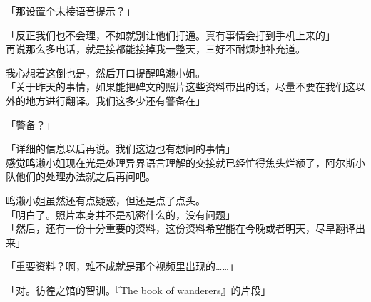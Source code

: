 「那设置个未接语音提示？」

「反正我们也不会理，不如就别让他们打通。真有事情会打到手机上来的」\\

再说那么多电话，就是接都能接掉我一整天，三好不耐烦地补充道。

我心想着这倒也是，然后开口提醒鸣濑小姐。\\

「关于昨天的事情，如果能把碑文的照片这些资料带出的话，尽量不要在我们这以外的地方进行翻译。我们这多少还有警备在」

「警备？」

「详细的信息以后再说。我们这边也有想问的事情」\\

感觉鸣濑小姐现在光是处理异界语言理解的交接就已经忙得焦头烂额了，阿尔斯小队他们的处理办法就之后再问吧。

鸣濑小姐虽然还有点疑惑，但还是点了点头。\\

「明白了。照片本身并不是机密什么的，没有问题」\\

「然后，还有一份十分重要的资料，这份资料希望能在今晚或者明天，尽早翻译出来」

「重要资料？啊，难不成就是那个视频里出现的……」

「对。彷徨之馆的智训。『The book of wanderers』的片段」\\

